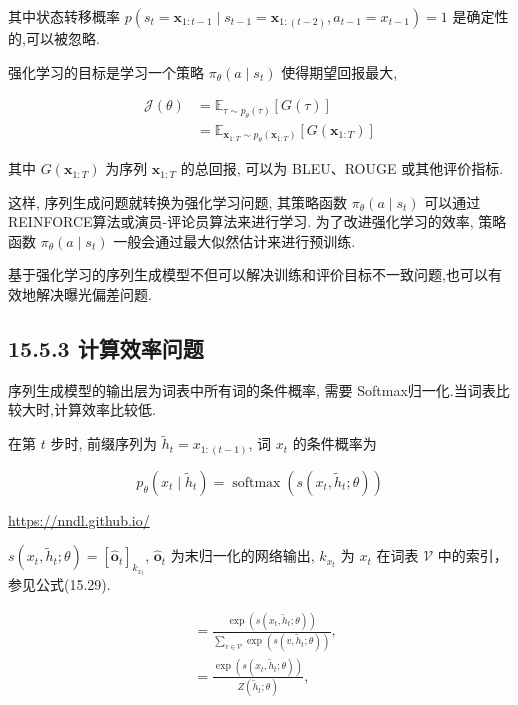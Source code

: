 \documentclass[10pt]{article}
\begin{document}
其中状态转移概率 $p\left(s_{t}=\boldsymbol{x}_{1: t-1} \mid s_{t-1}=\boldsymbol{x}_{1:(t-2)}, a_{t-1}=x_{t-1}\right)=1$ 是确定性的,可以被忽略.

强化学习的目标是学习一个策略 $\pi_{\theta}\left(a \mid s_{t}\right)$ 使得期望回报最大,


\begin{align*}
\mathcal{J}(\theta) & =\mathbb{E}_{\tau \sim p_{\theta}(\tau)}[G(\tau)]  \tag{15.45}\\
& =\mathbb{E}_{\boldsymbol{x}_{1: T} \sim p_{\theta}\left(\boldsymbol{x}_{1: T}\right)}\left[G\left(\boldsymbol{x}_{1: T}\right)\right] \tag{15.46}
\end{align*}


其中 $G\left(\boldsymbol{x}_{1: T}\right)$ 为序列 $\boldsymbol{x}_{1: T}$ 的总回报, 可以为 BLEU、ROUGE 或其他评价指标.

这样, 序列生成问题就转换为强化学习问题, 其策略函数 $\pi_{\theta}\left(a \mid s_{t}\right)$ 可以通过 REINFORCE算法或演员-评论员算法来进行学习. 为了改进强化学习的效率, 策略函数 $\pi_{\theta}\left(a \mid s_{t}\right)$ 一般会通过最大似然估计来进行预训练.

基于强化学习的序列生成模型不但可以解决训练和评价目标不一致问题,也可以有效地解决曝光偏差问题.

\subsection*{15.5.3 计算效率问题}
序列生成模型的输出层为词表中所有词的条件概率, 需要 Softmax归一化.当词表比较大时,计算效率比较低.

在第 $t$ 步时, 前缀序列为 $\tilde{h}_{t}=x_{1:(t-1)}$, 词 $x_{t}$ 的条件概率为


\begin{equation*}
p_{\theta}\left(x_{t} \mid \tilde{h}_{t}\right)=\operatorname{softmax}\left(s\left(x_{t}, \tilde{h}_{t} ; \theta\right)\right) \tag{15.47}
\end{equation*}


\href{https://nndl.github.io/}{https://nndl.github.io/}

$s\left(x_{t}, \tilde{h}_{t} ; \theta\right)=\left[\hat{\boldsymbol{o}}_{t}\right]_{k_{x_{t}}}$, $\hat{\boldsymbol{o}}_{t}$ 为末归一化的网络输出, $k_{x_{t}}$ 为 $x_{t}$ 在词表 $\mathcal{V}$ 中的索引，参见公式(15.29).


\begin{align*}
& =\frac{\exp \left(s\left(x_{t}, \tilde{h}_{t} ; \theta\right)\right)}{\sum_{v \in \mathcal{V}} \exp \left(s\left(v, \tilde{h}_{t} ; \theta\right)\right)},  \tag{15.48}\\
& =\frac{\exp \left(s\left(x_{t}, \tilde{h}_{t} ; \theta\right)\right)}{Z\left(\tilde{h}_{t} ; \theta\right)}, \tag{15.49}
\end{align*}
\end{document}
